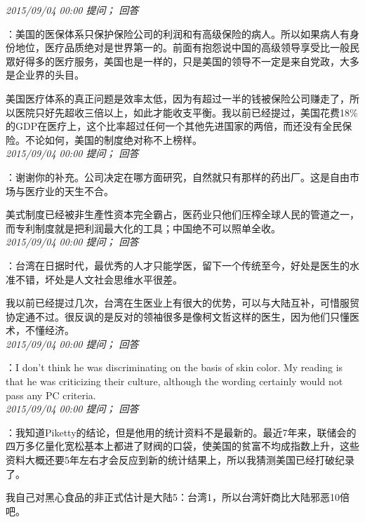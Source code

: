 \documentclass[twocolumn]{ctexart}
\begin{document}
\textit{\hfill\noindent\small 2015/09/04 00:00 提问； 回答}

：美国的医保体系只保护保险公司的利润和有高级保险的病人。所以如果病人有身份地位，医疗品质绝对是世界第一的。前面有抱怨说中国的高级领导享受比一般民眾好得多的医疗服务，美国也是一样的，只是美国的领导不一定是来自党政，大多是企业界的头目。

美国医疗体系的真正问题是效率太低，因为有超过一半的钱被保险公司赚走了，所以医院只好先超收三倍以上，如此才能收支平衡。我以前已经提过，美国花费18\%的GDP在医疗上，这个比率超过任何一个其他先进国家的两倍，而还没有全民保险。不论如何，美国的制度绝对称不上榜样。\\

\textit{\hfill\noindent\small 2015/09/04 00:00 提问； 回答}

：谢谢你的补充。公司决定在哪方面研究，自然就只有那样的药出厂。这是自由市场与医疗业的天生不合。

美式制度已经被非生產性资本完全霸占，医药业只他们压榨全球人民的管道之一，而专利制度就是把利润最大化的工具；中国绝不可以照单全收。\\

\textit{\hfill\noindent\small 2015/09/04 00:00 提问； 回答}

：台湾在日据时代，最优秀的人才只能学医，留下一个传统至今，好处是医生的水准不错，坏处是人文社会思维水平很差。

我以前已经提过几次，台湾在生医业上有很大的优势，可以与大陆互补，可惜服贸协定通不过。很反讽的是反对的领袖很多是像柯文哲这样的医生，因为他们只懂医术，不懂经济。\\

\textit{\hfill\noindent\small 2015/09/04 00:00 提问； 回答}

：I don't think he was discriminating on the basis of skin color. My reading is that he was criticizing their culture, although the wording certainly would not pass any PC criteria.\\

\textit{\hfill\noindent\small 2015/09/04 00:00 提问； 回答}

：我知道Piketty的结论，但是他用的统计资料不是最新的。最近7年来，联储会的四万多亿量化宽松基本上都进了财阀的口袋，使美国的贫富不均成指数上升，这些资料大概还要5年左右才会反应到新的统计结果上，所以我猜测美国已经打破纪录了。

我自己对黑心食品的非正式估计是大陆5：台湾1，所以台湾奸商比大陆邪恶10倍吧。\\
\end{document}
